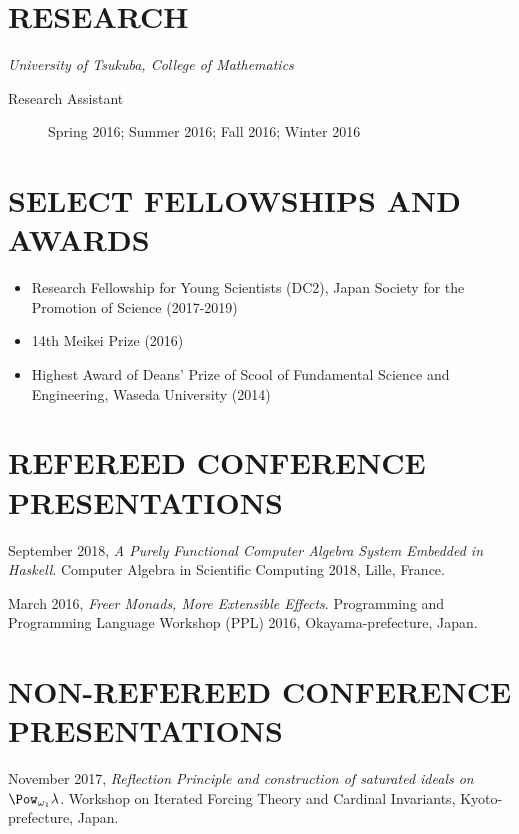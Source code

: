 \documentclass[letterpaper]{scrartcl}
\begin{document}
\section*{RESEARCH}
\emph{University of Tsukuba, College of Mathematics}
\begin{description}
 \item[Research Assistant]  Spring 2016; Summer 2016; Fall 2016; Winter 2016
\end{description}

\section*{SELECT FELLOWSHIPS AND AWARDS}
\begin{itemize}
 \item Research Fellowship for Young Scientists (DC2), Japan Society for the Promotion of Science (2017-2019)
 \item 14th Meikei Prize (2016)
 \item Highest Award of Deans' Prize of Scool of Fundamental Science and Engineering, Waseda University (2014)
\end{itemize}

\section*{REFEREED CONFERENCE PRESENTATIONS}
September 2018, \emph{A Purely Functional Computer Algebra System Embedded in Haskell}. Computer Algebra in Scientific Computing 2018, Lille, France.

March 2016, \emph{Freer Monads, More Extensible Effects}. Programming and Programming Language Workshop (PPL) 2016, Okayama-prefecture, Japan.

\section*{NON-REFEREED CONFERENCE PRESENTATIONS}
November 2017, \emph{Reflection Principle and construction of saturated ideals on $\Pow_{\omega_1} \lambda$}. Workshop on Iterated Forcing Theory and Cardinal Invariants, Kyoto-prefecture, Japan.

\nocite{ISHII:2016sf,Kiselyov:2015xy}
\printbibliography[title=BIBLIOGRAPHY]
\end{document}
